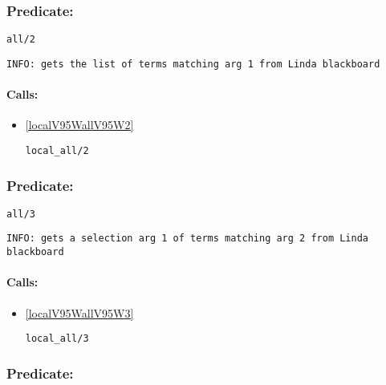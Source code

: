 \subsubsection{Predicate:} \label{allV95W2}

\begin{verbatim}
all/2
\end{verbatim}

{\small \begin{verbatim}
INFO: gets the list of terms matching arg 1 from Linda blackboard

\end{verbatim}}
\paragraph{Calls:} 
\begin{itemize}
\item \ref{localV95WallV95W2} 
\begin{verbatim}
local_all/2
\end{verbatim}

\end{itemize}

\subsubsection{Predicate:} \label{allV95W3}

\begin{verbatim}
all/3
\end{verbatim}

{\small \begin{verbatim}
INFO: gets a selection arg 1 of terms matching arg 2 from Linda blackboard

\end{verbatim}}
\paragraph{Calls:} 
\begin{itemize}
\item \ref{localV95WallV95W3} 
\begin{verbatim}
local_all/3
\end{verbatim}

\end{itemize}

\subsubsection{Predicate:} \label{allV95WanswersV95W3}

